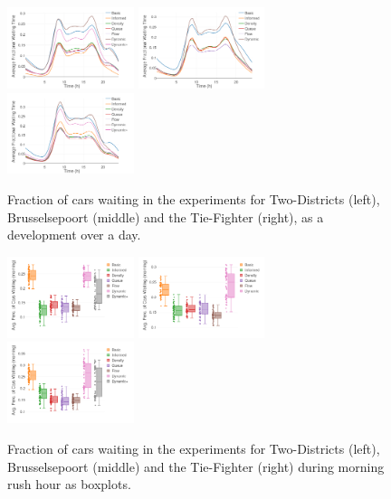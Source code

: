 \documentclass[11pt]{article}
\begin{document}
\begin{figure}[t]
	\includegraphics[width=0.33\textwidth]{img/frac_time_waiting_twodistr.png}
	\includegraphics[width=0.33\textwidth]{img/frac_time_waiting_maas.png}
	\includegraphics[width=0.33\textwidth]{img/frac_time_waiting_tie.png}
	\caption{Fraction of cars waiting in the experiments for Two-Districts (left), Brusselsepoort (middle) and the Tie-Fighter (right), as a development over a day. \label{fig:frac-waits-line}}
\end{figure}

\begin{figure}[t]
	\includegraphics[width=0.33\textwidth]{img/frac_time_waiting_twodistr_bp.png}
	\includegraphics[width=0.33\textwidth]{img/frac_time_waiting_maas_bp.png}
	\includegraphics[width=0.33\textwidth]{img/frac_time_waiting_tie_bp.png}
	\caption{Fraction of cars waiting in the experiments for Two-Districts (left), Brusselsepoort (middle) and the Tie-Fighter (right) during morning rush hour as boxplots. \label{fig:frac-waits-bp}}
\end{figure}
\end{document}
